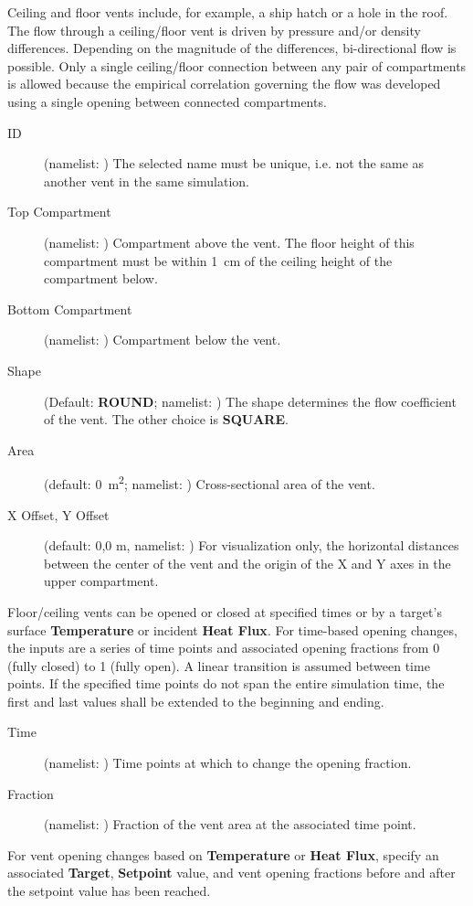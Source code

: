 {{Ceiling and floor vents include, for example, a ship hatch or a hole in the roof. The flow through a ceiling/floor vent is driven by pressure and/or density differences. Depending on the magnitude of the differences, bi-directional flow is possible. Only a single ceiling/floor connection between any pair of compartments is allowed because the empirical correlation governing the flow was developed using a single opening between connected compartments.
\begin{description}
\item[ID] (namelist: ) The selected name must be unique, i.e. not the same as another vent in the same simulation.
\item[Top Compartment] (namelist: ) Compartment above the vent. The floor height of this compartment must be within 1~cm of the ceiling height of the compartment below.
\item[Bottom Compartment] (namelist: ) Compartment below the vent.
\item[Shape] (Default: \textbf{ROUND}; namelist: ) The shape determines the flow coefficient of the vent. The other choice is \textbf{SQUARE}.
\item[Area] (default: 0~\unit{m^2}; namelist: ) Cross-sectional area of the vent.
\item[X Offset, Y Offset] (default: 0,0 m, namelist: ) For visualization only, the horizontal distances between the center of the vent and the origin of the X and Y axes in the upper compartment.
\end{description}
Floor/ceiling vents can be opened or closed at specified times or by a target's surface \textbf{Temperature} or incident \textbf{Heat Flux}. For time-based opening changes, the inputs are a series of time points and associated opening fractions from 0 (fully closed) to 1 (fully open). A linear transition is assumed between time points. If the specified time points do not span the entire simulation time, the first and last values shall be extended to the beginning and ending.
\begin{description}
\item[Time] (namelist: ) Time points at which to change the opening fraction.
\item[Fraction] (namelist: ) Fraction of the vent area at the associated time point.
\end{description}
For vent opening changes based on \textbf{Temperature} or \textbf{Heat Flux}, specify an associated \textbf{Target}, \textbf{Setpoint} value, and vent opening fractions before and after the setpoint value has been reached.



}}
